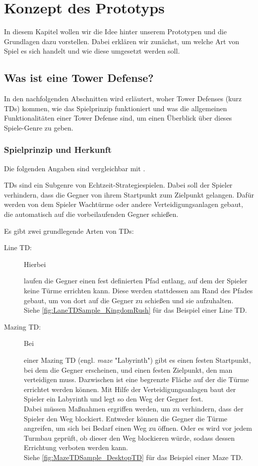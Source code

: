 \chapter{Konzept des Prototyps}

In diesem Kapitel wollen wir die Idee hinter unserem Prototypen und die Grundlagen dazu vorstellen. Dabei erklären wir zunächst, um welche Art von Spiel es sich handelt und wie diese umgesetzt werden soll.

\section{Was ist eine Tower Defense?}

In den nachfolgenden Abschnitten wird erläutert, woher Tower Defenses (kurz TDs) kommen, wie das Spielprinzip funktioniert und was die allgemeinen Funktionalitäten einer Tower Defense sind, um einen Überblick über dieses Spiele-Genre zu geben.

\subsection{Spielprinzip und Herkunft}

Die folgenden Angaben sind vergleichbar mit \cite{WIKI01}.

TDs sind ein Subgenre von Echtzeit-Strategiespielen. Dabei soll der Spieler verhindern, dass die Gegner von ihrem Startpunkt zum Zielpunkt gelangen. Dafür werden von dem Spieler Wachtürme oder andere Verteidigungsanlagen gebaut, die automatisch auf die vorbeilaufenden Gegner schießen.

Es gibt zwei grundlegende Arten von TDs:
\begin{description}
\item[Line TD:] \hypertarget{DefinitionLineTD}{Hierbei} laufen die Gegner einen fest definierten Pfad entlang, auf dem der Spieler keine Türme errichten kann. Diese werden stattdessen am Rand des Pfades gebaut, um von dort auf die Gegner zu schießen und sie aufzuhalten.\\
Siehe \autoref{fig:LaneTDSample_KingdomRush} für das Beispiel einer Line TD.
\item[Mazing TD:] \hypertarget{DefinitionMazingTD}{Bei} einer Mazing TD (engl. \textit{maze} "Labyrinth") gibt es einen festen Startpunkt, bei dem die Gegner erscheinen, und einen festen Zielpunkt, den man verteidigen muss. Dazwischen ist eine begrenzte Fläche auf der die Türme errichtet werden können. Mit Hilfe der Verteidigungsanlagen baut der Spieler ein Labyrinth und legt so den Weg der Gegner fest.\\
Dabei müssen Maßnahmen ergriffen werden, um zu verhindern, dass der Spieler den Weg blockiert. Entweder können die Gegner die Türme angreifen, um sich bei Bedarf einen Weg zu öffnen. Oder es wird vor jedem Turmbau geprüft, ob dieser den Weg blockieren würde, sodass dessen Errichtung verboten werden kann.\\
Siehe \autoref{fig:MazeTDSample_DesktopTD} für das Beispiel einer Maze TD.
\end{description}

